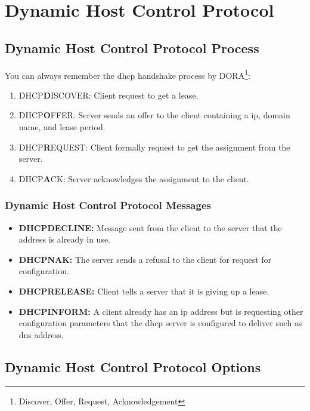 \chapter[DHCP]{Dynamic Host Control Protocol}

\section[DHCP Process]{Dynamic Host Control Protocol Process}

You can always remember the \gls{dhcp} handshake process by DORA\footnote{Discover, Offer, Request, Acknowledgement}:
\begin{enumerate}
    \item DHCP\textbf{D}ISCOVER: Client request to get a lease.
    \item DHCP\textbf{O}FFER: Server sends an offer to the client containing a \gls{ip}, domain name, and lease period.
    \item DHCP\textbf{R}EQUEST: Client formally request to get the assignment from the server.
    \item DHCP\textbf{A}CK: Server acknowledges the assignment to the client.
\end{enumerate}


\subsection[DHCP Messages]{Dynamic Host Control Protocol Messages}

\begin{itemize}
    \item \textbf{DHCPDECLINE:} Message sent from the client to the server that the address is already in use.
    \item \textbf{DHCPNAK:} The server sends a refusal to the client for request for configuration.
    \item \textbf{DHCPRELEASE:} Client tells a server that it is giving up a lease.
    \item \textbf{DHCPINFORM:} A client already has an \gls{ip} address but is requesting other configuration parameters that the \gls{dhcp} server is configured to deliver such as \gls{dns} address.
\end{itemize}

\section[DHCP Options]{Dynamic Host Control Protocol Options}

